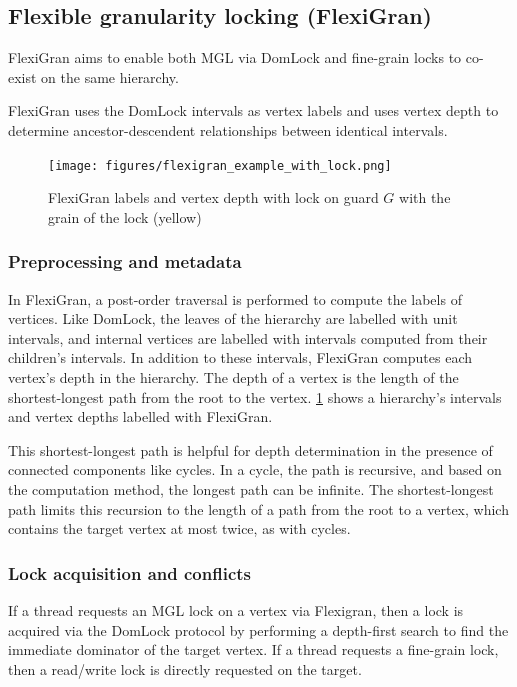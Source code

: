 \subsection{Flexible granularity locking (FlexiGran)}

FlexiGran \cite{FlexiGran2024} aims to enable both MGL via DomLock and fine-grain locks to co-exist on the same hierarchy. 

FlexiGran uses the DomLock intervals as vertex labels and uses vertex depth to determine ancestor-descendent relationships between identical intervals.

\begin{figure}
    \centering
    \captionsetup{justification=centering}
    \texttt{[image: figures/flexigran\_example\_with\_lock.png]}
    \caption{FlexiGran labels and vertex depth with lock on guard $G$ with the grain of the lock (yellow)}
    \label{fig:flexigran_example_locked}
\end{figure}

\subsubsection{Preprocessing and metadata}

In FlexiGran, a post-order traversal is performed to compute the labels of vertices. Like DomLock, the leaves of the hierarchy are labelled with unit intervals, and internal vertices are labelled with intervals computed from their children's intervals. In addition to these intervals, FlexiGran computes each vertex's depth in the hierarchy. The depth of a vertex is the length of the shortest-longest path from the root to the vertex. \cref{fig:flexigran_example_locked} shows a hierarchy's intervals and vertex depths labelled with FlexiGran.

This shortest-longest path is helpful for depth determination in the presence of connected components like cycles. In a cycle, the path is recursive, and based on the computation method, the longest path can be infinite. The shortest-longest path limits this recursion to the length of a path from the root to a vertex, which contains the target vertex at most twice, as with cycles. 

\subsubsection{Lock acquisition and conflicts}

If a thread requests an MGL lock on a vertex via Flexigran, then a lock is acquired via the DomLock protocol by performing a depth-first search to find the immediate dominator of the target vertex.
If a thread requests a fine-grain lock, then a read/write lock is directly requested on the target. 

